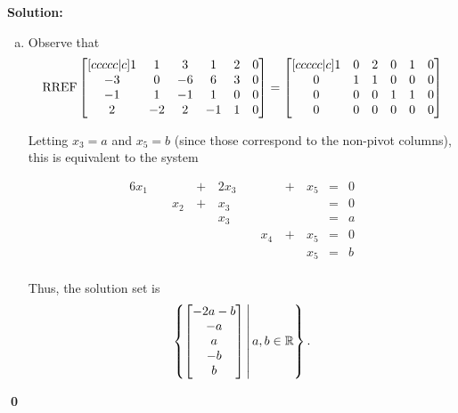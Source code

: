 \documentclass{article}
\newenvironment{solution}
{
  \ignorespaces
  \textbf{Solution:}
}
{
  \ignorespacesafterend
  \begin{flushright}
  {\bfseries \qed}
  \end{flushright}
}
\begin{document}
\begin{solution}
\begin{enumerate}[(a)]
\item Observe that
\[ \operatorname{RREF}
    \begin{bmatrix}[ccccc|c]
    1 & 1 & 3 & 1 & 2 & 0\\
    -3 & 0 & -6 & 6 & 3 & 0\\
    -1 & 1 & -1 & 1 & 0 & 0\\
    2 & -2 & 2 & -1 & 1& 0
    \end{bmatrix} =
    \begin{bmatrix}[ccccc|c]
    1 & 0 & 2 & 0 & 1 &0\\
    0 & 1 & 1 & 0 & 0 &0\\
    0 & 0 & 0 & 1 & 1 &0\\
    0 & 0 & 0 & 0 & 0&0
    \end{bmatrix}
\]

Letting \(x_3=a\) and \(x_5=b\)
(since those correspond to the non-pivot columns),
this is equivalent to the system

\begin{alignat*}{6}
x_1 &\,\,&  &\,+\,& 2x_3 &\,\,&  &\,+\,& x_5 &=& 0 \\
 &\,\,& x_2 &\,+\,& x_3 &\,\,& &\,\,&  &=& 0 \\
 &\,\,&  &\,\,& x_3 &\,\,&  &\,\,&  &=& a \\
 &\,\,&  &\,\,&  &\,\,& x_4 &\,+\,& x_5 &=& 0 \\
 &\,\,&  &\,\,&  &\,\,&  &\,\,& x_5 &=& b \\
\end{alignat*}

Thus, the solution set is
\[ \left\{\begin{bmatrix} -2a-b \\ -a \\ a \\ -b \\ b \end{bmatrix}\,\middle|\,a,b \in \mathbb{R}\right\} .\]


\end{enumerate}
\end{solution}
\end{document}
